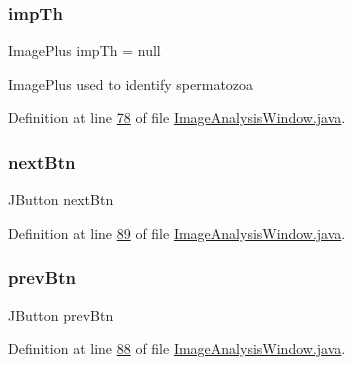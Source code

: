 \subsubsection{\texorpdfstring{imp\+Th}{impTh}}
{\footnotesize\ttfamily Image\+Plus imp\+Th = null\hspace{0.3cm}{\ttfamily [protected]}}

Image\+Plus used to identify spermatozoa 

Definition at line \hyperlink{_image_analysis_window_8java_source_l00078}{78} of file \hyperlink{_image_analysis_window_8java_source}{Image\+Analysis\+Window.\+java}.

\hypertarget{classgui_1_1_image_analysis_window_ad88013bcb23eecbb32f5e97911652f73}{}\label{classgui_1_1_image_analysis_window_ad88013bcb23eecbb32f5e97911652f73} 
\subsubsection{\texorpdfstring{next\+Btn}{nextBtn}}
{\footnotesize\ttfamily J\+Button next\+Btn\hspace{0.3cm}{\ttfamily [protected]}}



Definition at line \hyperlink{_image_analysis_window_8java_source_l00089}{89} of file \hyperlink{_image_analysis_window_8java_source}{Image\+Analysis\+Window.\+java}.

\hypertarget{classgui_1_1_image_analysis_window_ad7635bb9d707a780b5a81278b9bf8ff8}{}\label{classgui_1_1_image_analysis_window_ad7635bb9d707a780b5a81278b9bf8ff8} 
\subsubsection{\texorpdfstring{prev\+Btn}{prevBtn}}
{\footnotesize\ttfamily J\+Button prev\+Btn\hspace{0.3cm}{\ttfamily [protected]}}



Definition at line \hyperlink{_image_analysis_window_8java_source_l00088}{88} of file \hyperlink{_image_analysis_window_8java_source}{Image\+Analysis\+Window.\+java}.

